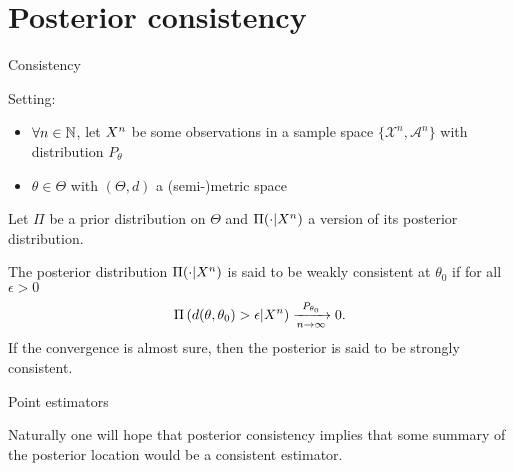 \section{Posterior consistency}


%





{Consistency}

Setting:
\begin{itemize}
\item $\forall n \in \mathbb{N}$, let $X^n$ be some observations in a sample space $\{\mathcal{X}^n,\mathcal{A}^n\}$ with distribution $P_\theta$
\item $\theta \in \Theta$ with $(\Theta,d)$ a (semi-)metric space 
\end{itemize}

Let $\Pi$ be a prior distribution on $\Theta$ and $\Pi(\cdot|X^n)$ a version of its posterior distribution. 
\begin{definition}[Consistency]
The posterior distribution $\Pi(\cdot|X^n)$ is said to be \alert{weakly consistent} at $\theta_0$ if for all $\epsilon >0$ 
$$
\Pi\left(d(\theta,\theta_0) > \epsilon|X^n\right) \xrightarrow[n\to \infty]{P_{\theta_0}} 0. 
$$
If the convergence is \alert{almost sure}, then the posterior is said to be \alert{strongly consistent}.
\end{definition}






{Point estimators}

Naturally one will hope that posterior consistency implies that some summary of the posterior location would be a consistent estimator. 
 

